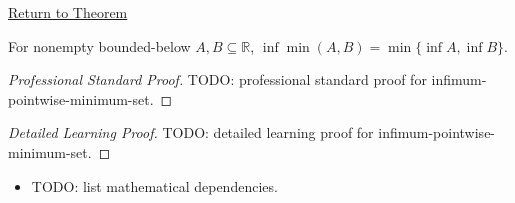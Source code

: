 \newpage
{}
\label{prf:infimum-pointwise-minimum-set}

\begin{remark*}[Return]
\hyperref[thm:infimum-pointwise-minimum-set]{Return to Theorem}
\end{remark*}

\begin{theorem*}
For nonempty bounded-below $A,B\subseteq\mathbb{R}$,
$\inf\min(A,B)=\min\{\inf A,\inf B\}$.
\end{theorem*}

\begin{proof}[Professional Standard Proof]
\LRAProofBodyStart
TODO: professional standard proof for infimum-pointwise-minimum-set.
\end{proof}

\begin{proof}[Detailed Learning Proof]
\LRAProofBodyStart
TODO: detailed learning proof for infimum-pointwise-minimum-set.
\end{proof}

\begin{remark*}
\end{remark*}

\begin{dependencies}
\begin{itemize}
  \item TODO: list mathematical dependencies.
\end{itemize}
\end{dependencies}

\clearpage
